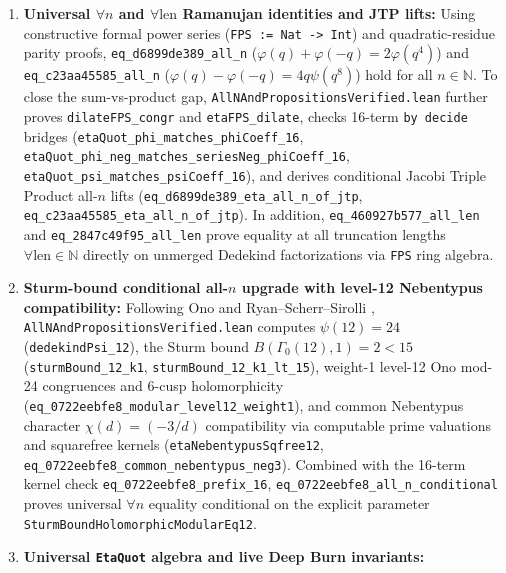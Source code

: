 \begin{enumerate}
  \item \textbf{Universal $\forall n$ and $\forall \text{len}$ Ramanujan identities and JTP lifts:}
    Using constructive formal power series (\texttt{FPS := Nat -> Int}) and quadratic-residue parity proofs, \texttt{eq\_d6899de389\_all\_n} ($\varphi(q)+\varphi(-q)=2\varphi(q^4)$) and \texttt{eq\_c23aa45585\_all\_n} ($\varphi(q)-\varphi(-q)=4q\psi(q^8)$) hold for all $n \in \mathbb{N}$. To close the sum-vs-product gap, \texttt{AllNAndPropositionsVerified.lean} further proves \texttt{dilateFPS\_congr} and \texttt{etaFPS\_dilate}, checks 16-term \texttt{by decide} bridges (\texttt{etaQuot\_phi\_matches\_phiCoeff\_16}, \texttt{etaQuot\_phi\_neg\_matches\_seriesNeg\_phiCoeff\_16}, \texttt{etaQuot\_psi\_matches\_psiCoeff\_16}), and derives conditional Jacobi Triple Product all-$n$ lifts (\texttt{eq\_d6899de389\_eta\_all\_n\_of\_jtp}, \texttt{eq\_c23aa45585\_eta\_all\_n\_of\_jtp}). In addition, \texttt{eq\_460927b577\_all\_len} and \texttt{eq\_2847c49f95\_all\_len} prove equality at all truncation lengths $\forall \text{len} \in \mathbb{N}$ directly on unmerged Dedekind factorizations via \texttt{FPS} ring algebra.
  \item \textbf{Sturm-bound conditional all-$n$ upgrade with level-12 Nebentypus compatibility:}
    Following Ono \cite{Ono2004} and Ryan--Scherr--Sirolli \cite{RyanScherrSirolli2019}, \texttt{AllNAndPropositionsVerified.lean} computes $\psi(12) = 24$ (\texttt{dedekindPsi\_12}), the Sturm bound $B(\Gamma_0(12), 1) = 2 < 15$ (\texttt{sturmBound\_12\_k1}, \texttt{sturmBound\_12\_k1\_lt\_15}), weight-1 level-12 Ono mod-24 congruences and 6-cusp holomorphicity (\texttt{eq\_0722eebfe8\_modular\_level12\_weight1}), and common Nebentypus character $\chi(d) = (-3/d)$ compatibility via computable prime valuations and squarefree kernels (\texttt{etaNebentypusSqfree12}, \texttt{eq\_0722eebfe8\_common\_nebentypus\_neg3}). Combined with the 16-term kernel check \texttt{eq\_0722eebfe8\_prefix\_16}, \texttt{eq\_0722eebfe8\_all\_n\_conditional} proves universal $\forall n$ equality conditional on the explicit \tierL{} parameter \texttt{SturmBoundHolomorphicModularEq12}.
  \item \textbf{Universal \texttt{EtaQuot} algebra and live Deep Burn invariants:}

\end{enumerate}
